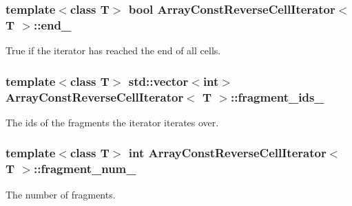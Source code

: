 \subsubsection[{end\+\_\+}]{\setlength{\rightskip}{0pt plus 5cm}template$<$class T$>$ bool {\bf Array\+Const\+Reverse\+Cell\+Iterator}$<$ T $>$\+::end\+\_\+\hspace{0.3cm}{\ttfamily [private]}}\label{classArrayConstReverseCellIterator_a80133c14893b4c29077916474a0d619f}
True if the iterator has reached the end of all cells. \hypertarget{classArrayConstReverseCellIterator_a59352cf72f01630fbaf1569831ab1c50}{}
\subsubsection[{fragment\+\_\+ids\+\_\+}]{\setlength{\rightskip}{0pt plus 5cm}template$<$class T$>$ std\+::vector$<$int$>$ {\bf Array\+Const\+Reverse\+Cell\+Iterator}$<$ T $>$\+::fragment\+\_\+ids\+\_\+\hspace{0.3cm}{\ttfamily [private]}}\label{classArrayConstReverseCellIterator_a59352cf72f01630fbaf1569831ab1c50}
The ids of the fragments the iterator iterates over. \hypertarget{classArrayConstReverseCellIterator_a616f2e6f4a96068623282746c0dcef3b}{}
\subsubsection[{fragment\+\_\+num\+\_\+}]{\setlength{\rightskip}{0pt plus 5cm}template$<$class T$>$ int {\bf Array\+Const\+Reverse\+Cell\+Iterator}$<$ T $>$\+::fragment\+\_\+num\+\_\+\hspace{0.3cm}{\ttfamily [private]}}\label{classArrayConstReverseCellIterator_a616f2e6f4a96068623282746c0dcef3b}
The number of fragments. \hypertarget{classArrayConstReverseCellIterator_a523e5c0d5dc9aab36984f9f439a0ec05}{}
